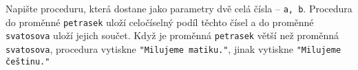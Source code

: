 \question[30]
Napište proceduru, která dostane jako parametry dvě celá čísla -- \texttt{a, b}.
Procedura do proměnné \texttt{petrasek} uloží celočíselný podíl těchto čísel a
do proměnné \texttt{svatosova} uloží jejich součet. Když je proměnná
\texttt{petrasek} větší než proměnná \texttt{svatosova}, procedura vytiskne
\texttt{"Milujeme matiku."}, jinak vytiskne \texttt{"Milujeme češtinu."}
